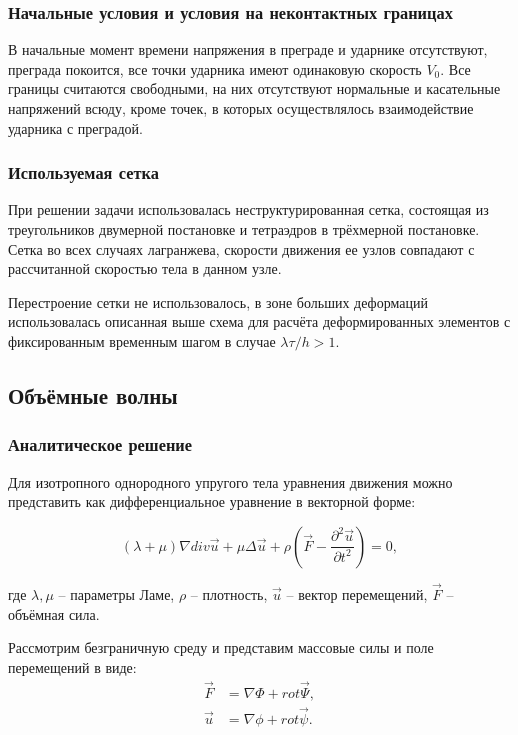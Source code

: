 \subsubsection*{Начальные условия и условия на неконтактных границах}

В начальные момент времени напряжения в преграде и ударнике отсутствуют, преграда покоится, все точки ударника имеют одинаковую скорость $V_0$. Все границы считаются свободными, на них отсутствуют нормальные и касательные напряжений всюду, кроме точек, в которых осуществлялось взаимодействие ударника с преградой.

\subsubsection*{Используемая сетка}

При решении задачи использовалась неструктурированная сетка, состоящая из треугольников двумерной постановке и тетраэдров в трёхмерной постановке. Сетка во всех случаях лагранжева, скорости движения ее узлов совпадают с рассчитанной скоростью тела в данном узле.

Перестроение сетки не использовалось, в зоне больших деформаций использовалась описанная выше схема для расчёта деформированных элементов с фиксированным временным шагом в случае $\lambda \tau / h > 1$.


\subsection{Объёмные волны}

\subsubsection{Аналитическое решение}

Для изотропного однородного упругого тела уравнения движения можно представить как дифференциальное уравнение в векторной форме:

\begin{equation}
(\lambda+\mu)\nabla{div\vec{u}} + \mu\Delta\vec{u} + \rho(\vec{F}-\frac{\partial^2 \vec{u}}{\partial t^2}) = 0,
\end{equation}

где $\lambda, \mu$ -- параметры Ламе, $\rho$ -- плотность, $\vec{u}$ -- вектор перемещений, $\vec{F}$ -- объёмная сила.

Рассмотрим безграничную среду и представим массовые силы и поле перемещений в виде:
\begin{align}
\vec{F} &= \nabla\Phi + rot\vec{\Psi}, \nonumber\\
\vec{u} &= \nabla\phi + rot\vec{\psi}.
\end{align}

